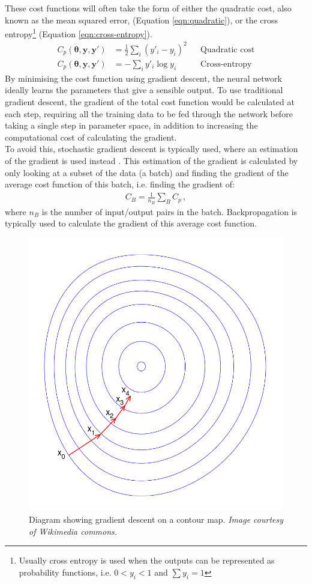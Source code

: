 \documentclass[11pt,a4paper,onecolumn]{report}
\begin{document}
These cost functions will often take the form of either the quadratic cost, also
known as the mean squared error, (Equation \ref{eqn:quadratic}), or the cross
entropy\footnote{Usually cross entropy is used when the outputs can be
represented as probability functions, i.e. \( 0 < y_i < 1\) and \(\sum y_i =
1\)} (Equation \ref{eqn:cross-entropy}).
\begin{align}
  C_p(\bm{\theta}, \bm{y}, \bm{y'}) &= \frac{1}{2} \sum\limits_{i}
    \left(y'_i - y_i\right)^2 && \text{Quadratic cost} \label{eqn:quadratic}\\
  C_p(\bm{\theta}, \bm{y}, \bm{y'}) &= - \sum\limits_{i}
  y'_i \log{y_i} && \text{Cross-entropy} \label{eqn:cross-entropy}
\end{align}
By minimising the cost function using gradient descent, the neural network
ideally learns the parameters that give a sensible output. To use traditional
gradient descent, the gradient of the total cost function would be calculated at
each step, requiring all the training data to be fed through the network before
taking a single step in parameter space, in addition to increasing the
computational cost of calculating the gradient.\\

To avoid this, stochastic gradient descent is typically used, where an
estimation of the gradient is used instead \citep{Bottou2010}. This estimation of
the gradient is calculated by only looking at a subset of the data (a batch) and
finding the gradient of the average cost function of this batch, i.e. finding
the gradient of:
\begin{align}
  C_B = \frac{1}{n_B} \sum\limits_{B} C_p \label{eqn:average cost}\,,
\end{align}
where \(n_B\) is the number of input/output pairs in the batch. Backpropagation
\citep{rumelhart_learning_1986} is typically used to calculate the gradient of
this average cost function.

\begin{figure}[t]
  \centering
  \includegraphics[width = 0.4\linewidth]{gradient_descent.png}
  \caption{Diagram showing gradient descent on a contour map. \textit{Image
  courtesy of Wikimedia commons.}}
  \label{fig:gradient_descent}
\end{figure}
\end{document}
